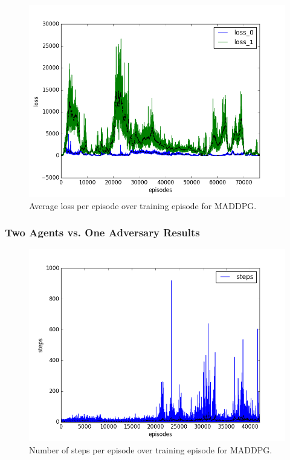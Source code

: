 \begin{figure}[h]
  \centering
  \includegraphics[trim=10 10 10 10,clip,width=\figscale\linewidth]
  {../results/maddpg_1vs1/loss.png}
  \caption{Average loss per episode over training episode for MADDPG.}
  \label{fig:maddpg-1vs1}
\end{figure}
\FloatBarrier


\subsubsection{Two Agents vs. One Adversary Results}
\label{sec:experiment:maddpg:1vs2}


\begin{figure}[h]
  \centering
  \includegraphics[trim=10 10 10 10,clip,width=\figscale\linewidth]
  {../results/maddpg_1vs2/steps.png}
  \caption{Number of steps per episode over training episode for MADDPG.}
  \label{fig:maddpg-1vs2}
\end{figure}
\FloatBarrier


